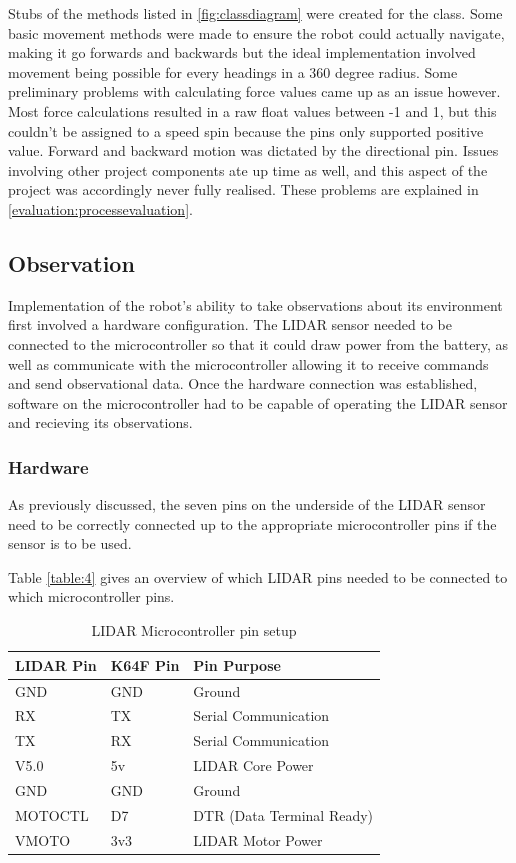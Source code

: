 				Stubs of the methods listed in \ref{fig:classdiagram} were created for the class. Some basic movement methods were made to ensure the robot could actually navigate, making it go forwards and backwards but the ideal implementation involved movement being possible for every headings in a 360 degree radius. Some preliminary problems with calculating force values came up as an issue however. Most force calculations resulted in a raw float values between -1 and 1, but this couldn't be assigned to a speed spin because the pins only supported positive value. Forward and backward motion was dictated by the directional pin. Issues involving other project components ate up time as well, and this aspect of the project was accordingly never fully realised. These problems are explained in \ref{evaluation:processevaluation}.
				
			\subsection{Observation}
			Implementation of the robot's ability to take observations about its environment first involved a hardware configuration. The LIDAR sensor needed to be connected to the microcontroller so that it could draw power from the battery, as well as communicate with the microcontroller allowing it to receive commands and send observational data. Once the hardware connection was established, software on the microcontroller had to be capable of operating the LIDAR sensor and recieving its observations.
				\subsubsection{Hardware}
				As previously discussed, the seven pins on the underside of the LIDAR sensor need to be correctly connected up to the appropriate microcontroller pins if the sensor is to be used.
				
				Table \ref{table:4} gives an overview of which LIDAR pins needed to be connected to which microcontroller pins.
				
				\begin{table}[h!]
					\centering
					\begin{tabular}{|| l | l | l ||} 
						\hline
						LIDAR Pin & K64F Pin & Pin Purpose \\ [0.5ex] 
						\hline
						GND  & GND & Ground  \\ 
						RX  & TX  & Serial Communication \\
						TX  & RX & Serial Communication \\
						V5.0 & 5v & LIDAR Core Power \\ 
						GND & GND & Ground \\ 
						MOTOCTL & D7 & DTR (Data Terminal Ready) \\ 
						VMOTO & 3v3 & LIDAR Motor Power \\ [1ex] 
						\hline
					\end{tabular}
					\caption{LIDAR Microcontroller pin setup}
					\label{table:3}
				\end{table}
			
